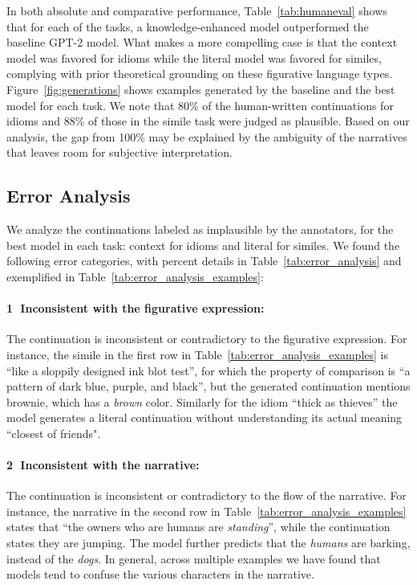 In both absolute and comparative performance, Table~\ref{tab:humaneval} shows that for each of the tasks, a knowledge-enhanced model outperformed the baseline GPT-2 model. What makes a more compelling case is that the context model was favored for idioms while the literal model was favored for similes, complying with prior theoretical grounding on these figurative language types. Figure~\ref{fig:generations} shows examples generated by the baseline and the best model for each task. We note that 80\% of the human-written continuations for idioms and 88\% of those in the simile task were judged as plausible. Based on our analysis, the gap from 100\% may be explained by the ambiguity of the narratives that leaves room for subjective interpretation. 

\subsection{Error Analysis}
\label{sec:generative_analysis}


We analyze the continuations labeled as implausible by the annotators, for the best model in each task: context for idioms and literal for similes. We found the following error categories, with percent details in Table~\ref{tab:error_analysis} and exemplified in Table~\ref{tab:error_analysis_examples}: 

\noindent \paragraph{\textcircled{1} Inconsistent with the figurative expression:} The continuation is inconsistent or contradictory to the figurative expression. For instance, the simile in the first row in Table~\ref{tab:error_analysis_examples} is ``like a sloppily designed ink blot test'', for which the property of comparison is ``a pattern of dark blue, purple, and black'', but the generated continuation mentions brownie, which has a \emph{brown} color. Similarly for the idiom ``thick as thieves'' the model generates a literal continuation without understanding its actual meaning ``closest of friends". 


\noindent \paragraph{\textcircled{2} Inconsistent with the narrative:} The continuation is inconsistent or contradictory to the flow of the narrative. For instance, the narrative in the second row in Table~\ref{tab:error_analysis_examples} states that ``the owners who are humans are \emph{standing}'', while the continuation states they are jumping. The model further predicts that the \emph{humans} are barking, instead of the \emph{dogs}. In general, across multiple examples we have found that models tend to confuse the various characters in the narrative.


